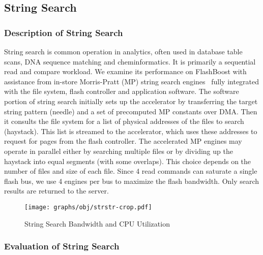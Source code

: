 %

\subsection{String Search}

\subsubsection{Description of String Search}

String search is common operation in analytics, often used in
database table scans, DNA sequence matching and cheminformatics. It is 
primarily a sequential read and compare workload. We
examine its performance on FlashBoost with assistance from in-store Morris-Pratt (MP) 
string search engines~\cite{mpalgo} fully integrated with the file system, flash controller
and application software.  The software portion of string search initially sets
up the accelerator by transferring the target string pattern (needle) and a set
of precomputed MP constants over DMA. Then it consults the file system for a
list of physical addresses of the files to search (haystack).  This list is
streamed to the accelerator, which uses these addresses to request for pages
from the flash controller.  The accelerated MP engines may operate in parallel
either by searching multiple files or by dividing up the haystack into equal
segments (with some overlaps). This choice depends on the number of files and
size of each file. Since 4 read commands can saturate a single flash bus, we
use 4 engines per bus to maximize the flash bandwidth. Only
search results are returned to the server. 

\begin{figure}[t]
	\centering
	\texttt{[image: graphs/obj/strstr-crop.pdf]}
	\caption{String Search Bandwidth and CPU Utilization}
	\label{fig:result_strstr}
\end{figure}

\subsubsection{Evaluation of String Search}

